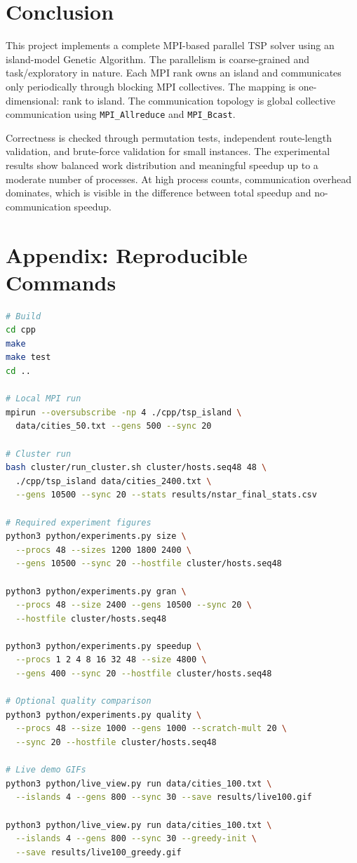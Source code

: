 \documentclass[11pt,a4paper]{article}
\begin{document}
\section{Conclusion}
This project implements a complete MPI-based parallel TSP solver using an
island-model Genetic Algorithm. The parallelism is coarse-grained and
task/exploratory in nature. Each MPI rank owns an island and communicates only
periodically through blocking MPI collectives. The mapping is one-dimensional:
rank to island. The communication topology is global collective communication
using \texttt{MPI\_Allreduce} and \texttt{MPI\_Bcast}.

Correctness is checked through permutation tests, independent route-length
validation, and brute-force validation for small instances. The experimental
results show balanced work distribution and meaningful speedup up to a moderate
number of processes. At high process counts, communication overhead dominates,
which is visible in the difference between total speedup and no-communication
speedup.

\section*{Appendix: Reproducible Commands}

\begin{lstlisting}[language=bash]
# Build
cd cpp
make
make test
cd ..

# Local MPI run
mpirun --oversubscribe -np 4 ./cpp/tsp_island \
  data/cities_50.txt --gens 500 --sync 20

# Cluster run
bash cluster/run_cluster.sh cluster/hosts.seq48 48 \
  ./cpp/tsp_island data/cities_2400.txt \
  --gens 10500 --sync 20 --stats results/nstar_final_stats.csv

# Required experiment figures
python3 python/experiments.py size \
  --procs 48 --sizes 1200 1800 2400 \
  --gens 10500 --sync 20 --hostfile cluster/hosts.seq48

python3 python/experiments.py gran \
  --procs 48 --size 2400 --gens 10500 --sync 20 \
  --hostfile cluster/hosts.seq48

python3 python/experiments.py speedup \
  --procs 1 2 4 8 16 32 48 --size 4800 \
  --gens 400 --sync 20 --hostfile cluster/hosts.seq48

# Optional quality comparison
python3 python/experiments.py quality \
  --procs 48 --size 1000 --gens 1000 --scratch-mult 20 \
  --sync 20 --hostfile cluster/hosts.seq48

# Live demo GIFs
python3 python/live_view.py run data/cities_100.txt \
  --islands 4 --gens 800 --sync 30 --save results/live100.gif

python3 python/live_view.py run data/cities_100.txt \
  --islands 4 --gens 800 --sync 30 --greedy-init \
  --save results/live100_greedy.gif
\end{lstlisting}
\end{document}
